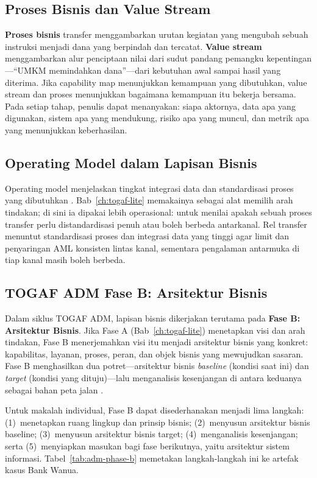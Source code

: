 \subsection{Proses Bisnis dan Value Stream}

\textbf{Proses bisnis} transfer menggambarkan urutan kegiatan yang mengubah
sebuah instruksi menjadi dana yang berpindah dan tercatat. \textbf{Value stream}
menggambarkan alur penciptaan nilai dari sudut pandang pemangku
kepentingan---``UMKM memindahkan dana''---dari kebutuhan awal sampai hasil yang
diterima. Jika capability map menunjukkan kemampuan yang dibutuhkan, value
stream dan proses menunjukkan bagaimana kemampuan itu bekerja bersama. Pada
setiap tahap, penulis dapat menanyakan: siapa aktornya, data apa yang digunakan,
sistem apa yang mendukung, risiko apa yang muncul, dan metrik apa yang
menunjukkan keberhasilan.

\subsection{Operating Model dalam Lapisan Bisnis}

Operating model menjelaskan tingkat integrasi data dan standardisasi proses yang
dibutuhkan \cite{ross2006enterprise}. Bab~\ref{ch:togaf-lite} memakainya sebagai
alat memilih arah tindakan; di sini ia dipakai lebih operasional: untuk menilai
apakah sebuah proses transfer perlu distandardisasi penuh atau boleh berbeda
antarkanal. Rel transfer menuntut standardisasi proses dan integrasi data yang
tinggi agar limit dan penyaringan AML konsisten lintas kanal, sementara
pengalaman antarmuka di tiap kanal masih boleh berbeda.

\subsection{TOGAF ADM Fase B: Arsitektur Bisnis}

Dalam siklus TOGAF ADM, lapisan bisnis dikerjakan terutama pada \textbf{Fase B:
Arsitektur Bisnis}. Jika Fase A (Bab~\ref{ch:togaf-lite}) menetapkan visi dan
arah tindakan, Fase B menerjemahkan visi itu menjadi arsitektur bisnis yang
konkret: kapabilitas, layanan, proses, peran, dan objek bisnis yang mewujudkan
sasaran. Fase B menghasilkan dua potret---arsitektur bisnis \emph{baseline}
(kondisi saat ini) dan \emph{target} (kondisi yang dituju)---lalu menganalisis
kesenjangan di antara keduanya sebagai bahan peta jalan \cite{togaf10}.

Untuk makalah individual, Fase B dapat disederhanakan menjadi lima langkah:
(1)~menetapkan ruang lingkup dan prinsip bisnis; (2)~menyusun arsitektur bisnis
baseline; (3)~menyusun arsitektur bisnis target; (4)~menganalisis kesenjangan;
serta (5)~menyiapkan masukan bagi fase berikutnya, yaitu arsitektur sistem
informasi. Tabel~\ref{tab:adm-phase-b} memetakan langkah-langkah ini ke artefak
kasus Bank Wanua.


